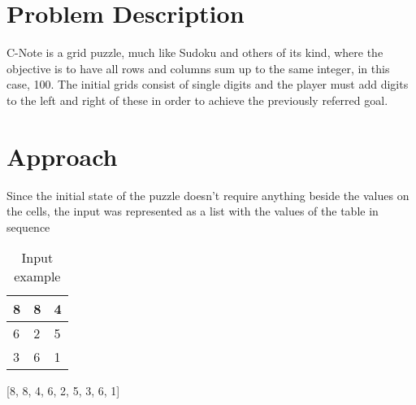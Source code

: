\documentclass[runningheads]{llncs}
\newcommand{\red}[1]{\textcolor{red}{#1}}
\begin{document}
\section{Problem Description}
C-Note is a grid puzzle, much like Sudoku and others of its kind, where the objective is to have all rows and columns sum up to the same integer, in this case, 100. The initial grids consist of single digits and the player must add digits to the left and right of these in order to achieve the previously referred goal. 


\section{Approach}
Since the initial state of the puzzle doesn't require anything beside the values on the cells, the input was represented as a list with the values of the table in sequence

\begin{table}
    \caption{Input example}
    \centering
    \begin{tabular}{|p{1cm}|p{1cm}|p{1cm}|}
    \hline
    8&8&4\\[5pt]
    \hline
    6&2&5\\[5pt]
    \hline
    3&6&1\\[5pt]
    \hline
    \end{tabular}
\end{table}
\begin{center}
    [8, 8, 4, 6, 2, 5, 3, 6, 1]
\end{center}
\end{document}
